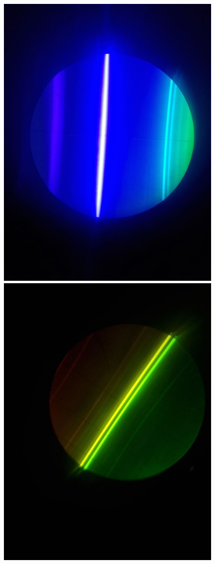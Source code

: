 \documentclass[a4paper,12pt]{article}
\begin{document}
\begin{figure}[H]
    \centering
    \includegraphics[scale=0.2]{blue.png}
    \includegraphics[scale=0.2]{yellow.png}

\end{figure}
\end{document}

